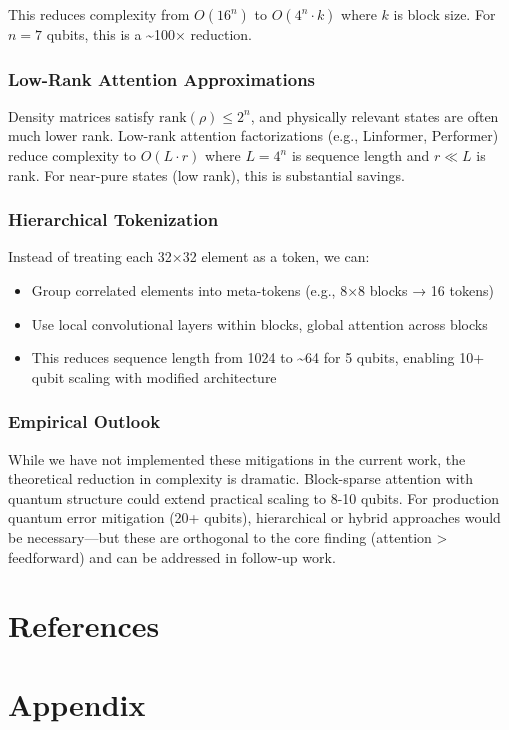 \documentclass[11pt]{article}
\begin{document}
This reduces complexity from \(O(16^n)\) to \(O(4^n \cdot k)\) where \(k\) is block size. For \(n=7\) qubits, this is a \textasciitilde{}100× reduction.
\subsubsection{Low-Rank Attention Approximations}
\label{sec:org665c4e3}

Density matrices satisfy \(\text{rank}(\rho) \leq 2^n\), and physically relevant states are often much lower rank. Low-rank attention factorizations (e.g., Linformer, Performer) reduce complexity to \(O(L \cdot r)\) where \(L = 4^n\) is sequence length and \(r \ll L\) is rank. For near-pure states (low rank), this is substantial savings.
\subsubsection{Hierarchical Tokenization}
\label{sec:orge172d02}

Instead of treating each 32×32 element as a token, we can:
\begin{itemize}
\item Group correlated elements into meta-tokens (e.g., 8×8 blocks → 16 tokens)
\item Use local convolutional layers within blocks, global attention across blocks
\item This reduces sequence length from 1024 to \textasciitilde{}64 for 5 qubits, enabling 10+ qubit scaling with modified architecture
\end{itemize}
\subsubsection{Empirical Outlook}
\label{sec:org6322609}

While we have not implemented these mitigations in the current work, the theoretical reduction in complexity is dramatic. Block-sparse attention with quantum structure could extend practical scaling to 8-10 qubits. For production quantum error mitigation (20+ qubits), hierarchical or hybrid approaches would be necessary—but these are orthogonal to the core finding (attention > feedforward) and can be addressed in follow-up work.
\section{References}
\label{sec:org9dc4704}


\section{Appendix}
\label{sec:org8c5b58d}
\end{document}
